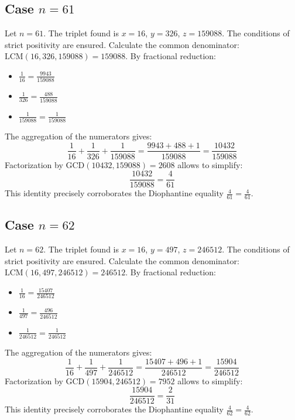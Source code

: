 \documentclass[11pt,a4paper]{article}
\begin{document}
\subsection{Case $n = 61$}
Let $n = 61$. The triplet found is $x = 16$, $y = 326$, $z = 159088$.
The conditions of strict positivity are ensured.
Calculate the common denominator: $\text{LCM}(16, 326, 159088) = 159088$.
By fractional reduction:
\begin{itemize}
    \item $\frac{1}{16} = \frac{9943}{159088}$
    \item $\frac{1}{326} = \frac{488}{159088}$
    \item $\frac{1}{159088} = \frac{1}{159088}$
\end{itemize}
The aggregation of the numerators gives:
$$ \frac{1}{16} + \frac{1}{326} + \frac{1}{159088} = \frac{9943 + 488 + 1}{159088} = \frac{10432}{159088} $$
Factorization by $\text{GCD}(10432, 159088) = 2608$ allows to simplify:
$$ \frac{10432}{159088} = \frac{4}{61} $$
This identity precisely corroborates the Diophantine equality $\frac{4}{61} = \frac{4}{61}$.

\subsection{Case $n = 62$}
Let $n = 62$. The triplet found is $x = 16$, $y = 497$, $z = 246512$.
The conditions of strict positivity are ensured.
Calculate the common denominator: $\text{LCM}(16, 497, 246512) = 246512$.
By fractional reduction:
\begin{itemize}
    \item $\frac{1}{16} = \frac{15407}{246512}$
    \item $\frac{1}{497} = \frac{496}{246512}$
    \item $\frac{1}{246512} = \frac{1}{246512}$
\end{itemize}
The aggregation of the numerators gives:
$$ \frac{1}{16} + \frac{1}{497} + \frac{1}{246512} = \frac{15407 + 496 + 1}{246512} = \frac{15904}{246512} $$
Factorization by $\text{GCD}(15904, 246512) = 7952$ allows to simplify:
$$ \frac{15904}{246512} = \frac{2}{31} $$
This identity precisely corroborates the Diophantine equality $\frac{4}{62} = \frac{4}{62}$.
\end{document}
